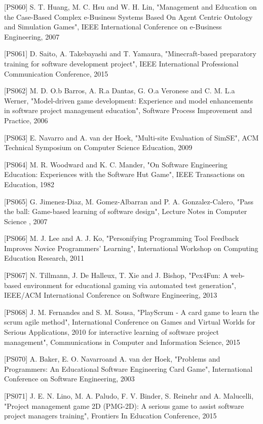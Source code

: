 [PS060]	S. T. Huang, M. C. Hsu and W. H. Lin, "Management and Education on the Case-Based Complex e-Business Systems Based On Agent Centric Ontology and Simulation Games", IEEE International Conference on e-Business Engineering, 2007

[PS061]	D. Saito, A. Takebayashi and T. Yamaura, "Minecraft-based preparatory training for 
software development project", IEEE International Professional Communication Conference, 2015

[PS062]	M. D. O.b Barros, A. R.a Dantas, G. O.a Veronese and C. M. L.a Werner, "Model-driven 
game development: Experience and model enhancements in software project management education", Software Process Improvement and Practice, 2006

[PS063]	E. Navarro and A. van der Hoek, "Multi-site Evaluation of SimSE", ACM Technical 
Symposium on Computer Science Education, 2009

[PS064]	M. R. Woodward and K. C. Mander, "On Software Engineering Education: Experiences with the Software Hut Game", IEEE Transactions on Education, 1982

[PS065]	G. Jimenez-Diaz, M. Gomez-Albarran and P. A. Gonzalez-Calero, "Pass the ball: Game-based learning of software design", Lecture Notes in Computer Science , 2007

[PS066]	M. J. Lee and A. J. Ko, "Personifying Programming Tool Feedback Improves Novice Programmers' Learning", International Workshop on Computing Education Research, 2011

[PS067]	N. Tillmann, J. De Halleux, T. Xie and J. Bishop, "Pex4Fun: A web-based environment for educational gaming via automated test generation", IEEE/ACM International Conference on Software Engineering, 2013

[PS068]	J. M. Fernandes and S. M. Sousa, "PlayScrum - A card game to learn the scrum agile 
method", International Conference on Games and Virtual Worlds for Serious Applications, 2010 for interactive learning of software project management", Communications in Computer and Information Science, 2015

[PS070]	A. Baker, E. O. Navarroand A. van der Hoek, "Problems and Programmers: An Educational Software Engineering Card Game", International Conference on Software Engineering, 2003

[PS071]	J. E. N. Lino, M. A. Paludo, F. V. Binder, S. Reinehr and A. Malucelli, "Project management game 2D (PMG-2D): A serious game to assist software project managers training", Frontiers In Education Conference, 2015

